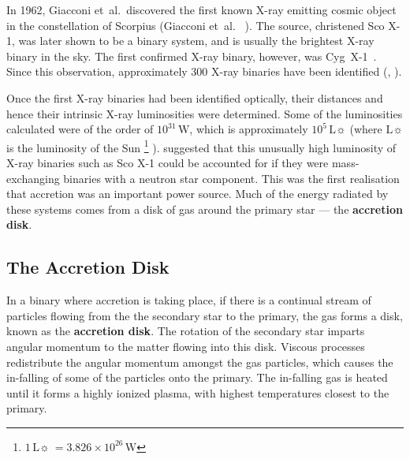\vspace{\myparskip}

In 1962, Giacconi et~al.\ discovered the first known X-ray emitting cosmic
object in the constellation of Scorpius (Giacconi et~al.\ %
). %
The source, christened Sco X-1, was later shown to be a binary
system, and is usually the brightest X-ray binary in the sky. The
first confirmed X-ray binary, however, was \mbox{Cyg X-1}~\cite{WebsterMurdin:1972,Bolton:1972}. %
Since this observation, approximately 300 X-ray binaries have been
identified %
(,
).%

\vspace{\myparskip}

Once the first X-ray binaries had been identified optically, their
distances and hence their intrinsic X-ray luminosities were determined. Some of the luminosities calculated were of the order of $10^{31}\,\mathrm{W}$, which is approximately
$10^5\,\mathrm{L}\sun$ (where $\mathrm{L}\sun$ is the
luminosity of the Sun%
\footnote{\label{cha:Introduction:sec:X-rayBinaries:foot:Lsun}
$1\,\mathrm{L}\sun\ = 3.826 \times 10^{26}\,\mathrm{W}$ }%
).\label{cha:Introduction:sec:X-rayBinaries:subsec:CompactObjects:topic:HighLum}
suggested that this unusually high luminosity of X-ray binaries such as
Sco X-1 could be accounted for if they were mass-exchanging binaries
with a neutron star component. %
This was the first realisation that accretion was an important power
source. Much of the energy radiated by these systems comes from a disk of gas around the primary star --- the \textbf{accretion disk}.


\subsection{The Accretion Disk}\label{cha:Introduction:sec:BinaryStarSystems:subsec:AccretionDisk}

In a binary where accretion is taking place, if there is a continual stream of particles flowing from the
the secondary star to the primary, the gas forms a disk, known as the
\textbf{accretion disk}. %
The rotation of the secondary star imparts angular momentum to the matter flowing into this disk.
Viscous processes redistribute the angular momentum amongst the
gas particles, which causes the in-falling of some of the particles onto the primary. The in-falling
gas is heated until it forms a highly ionized plasma, with highest
temperatures closest to the primary. %

